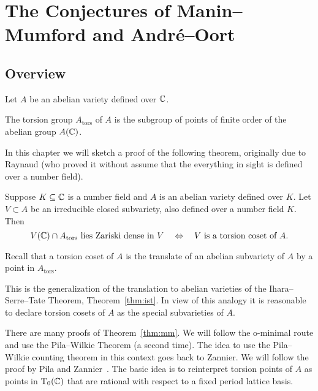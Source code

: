 \chapter{The Conjectures of Manin--Mumford and Andr\'e--Oort}

\section{Overview}

Let $A$ be an abelian variety defined over ${\mathbb{C}}$.

\begin{definition}
  The torsion group $A_{\mathrm{tors}}$ of $A$ is the subgroup of points
  of finite order of the abelian group $A({\mathbb{C}})$.
\end{definition}

In this chapter we will sketch a proof of the following theorem,
originally due to Raynaud (who proved it without assume that the
everything in sight is defined over a number field).

\begin{theorem}
  Suppose $K\subseteq{\mathbb{C}}$ is a number field and $A$ is an abelian
  variety defined over $K$. 
  Let $V\subset A$ be an irreducible closed subvariety, also defined over a
  number field $K$. Then
  \begin{equation*}
    V({\mathbb{C}}) \cap A_{\mathrm{tors}} \text{ lies Zariski dense in
      $V$}\quad\Leftrightarrow \quad
    \text{$V$ is a torsion coset of $A$.}
  \end{equation*}
\end{theorem}

Recall that a torsion coset of $A$ is the translate of an abelian
subvariety of $A$ by a point in $A_{\mathrm{tors}}$. 

This is the generalization of the translation to abelian varieties of
the Ihara--Serre--Tate Theorem, Theorem~\ref{thm:ist}. In view of this
analogy it is reasonable to declare torsion cosets of $A$ as the
special subvarieties of $A$.

There are many proofs of Theorem~\ref{thm:mm}. We will follow the
o-minimal route and use the Pila--Wilkie Theorem (a second time). The
idea to use the Pila--Wilkie counting theorem in this context goes
back to Zannier. We will follow the proof by Pila and
Zannier~\cite{PilaZannier}. The basic idea is to reinterpret torsion
points of $A$ as points in $\mathrm{T}_0({\mathbb{C}})$ that are rational with
respect to a fixed period lattice basis.

